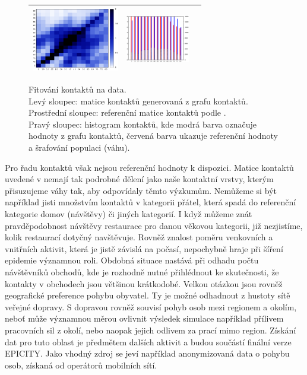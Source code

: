 \begin{figure}
\begin{center}
\begin{tabular}{|ccc|}
      \includegraphics[width=38mm]{pic/all_mat_ref.eps} &
      \includegraphics[width=28mm]{pic/all.eps}\\
      \hline

\end{tabular}
\end{center}
\caption{Fitování kontaktů na data.  \\ Levý sloupec: matice kontaktů generovaná z grafu kontaktů. \\ Prostřední sloupec: referenční matice kontaktů podle \cite{Prem_etal2017}. \\ Pravý sloupec: histogram kontaktů, kde modrá barva označuje hodnoty z grafu kontaktů, červená barva ukazuje referenční hodnoty a šrafování populaci (váhu).}
\label{maticekontaktu}
\end{figure}

Pro řadu kontaktů však nejsou referenční hodnoty k dispozici. Matice kontaktů uvedené v \cite{Prem_etal2017} nemají tak podrobné dělení jako naše kontaktní vrstvy, kterým přisuzujeme váhy tak, aby odpovídaly těmto výzkumům. Nemůžeme si být například jisti množstvím kontaktů v kategorii přátel, která spadá do referenční kategorie domov (návštěvy) či jiných kategorií. I když můžeme znát pravděpodobnost návštěvy restaurace pro danou věkovou kategorii, již nezjistíme, kolik restaurací dotyčný navštěvuje. Rovněž znalost poměru venkovních a vnitřních aktivit, která je jistě závislá na počasí, nepochybně hraje při šíření epidemie významnou roli. Obdobná situace nastává při odhadu počtu návštěvníků obchodů, kde je rozhodně nutné přihlédnout ke skutečnosti, že kontakty v obchodech jsou většinou krátkodobé.
Velkou otázkou jsou rovněž geografické preference pohybu obyvatel. Ty je možné odhadnout z hustoty sítě veřejné dopravy. S dopravou rovněž souvisí pohyb osob mezi regionem a okolím, neboť může významnou měrou ovlivnit výsledek simulace například přílivem pracovních sil z okolí, nebo naopak jejich odlivem za prací mimo region. Získání dat pro tuto oblast je předmětem dalších aktivit a budou součástí finální verze EPICITY. Jako vhodný zdroj se jeví například anonymizovaná data o pohybu osob, získaná od operátorů mobilních sítí. 

